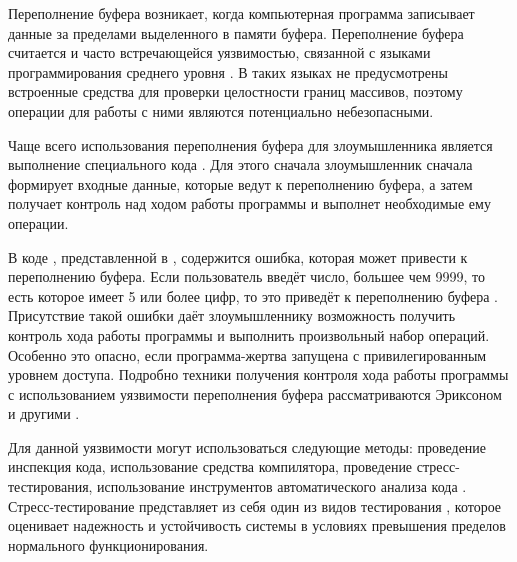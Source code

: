 

%
Переполнение буфера возникает, когда компьютерная программа записывает данные за пределами выделенного в памяти буфера.
%
Переполнение буфера считается  и часто встречающейся уязвимостью, связанной с языками программирования среднего уровня . 
%
В таких языках не предусмотрены встроенные средства для проверки целостности границ массивов, поэтому операции для работы с ними являются потенциально небезопасными. 

%
Чаще всего  использования переполнения буфера для злоумышленника является выполнение специального кода . 
%
Для этого сначала злоумышленник сначала формирует входные данные, которые ведут к переполнению буфера, а затем получает контроль над ходом работы программы и выполнет необходимые ему операции. 

%
В коде , представленной в , содержится ошибка, которая может привести к переполнению буфера.
%
Если пользователь введёт число, большее чем 9999, то есть которое имеет 5 или более цифр, то это приведёт к переполнению буфера .
%
Присутствие такой ошибки даёт злоумышленнику возможность получить контроль хода работы программы и выполнить произвольный набор операций.
%
Особенно это опасно, если программа-жертва запущена с привилегированным уровнем доступа.
%
Подробно техники получения контроля хода работы программы с использованием уязвимости переполнения буфера рассматриваются Эриксоном и другими  .

%
Для  данной уязвимости могут использоваться следующие методы: проведение инспекция кода, использование средства компилятора, проведение стресс-тестирования, использование инструментов автоматического анализа кода   .
%
Стресс-тестирование представляет из себя один из видов тестирования , которое оценивает надежность и устойчивость системы в условиях превышения пределов нормального функционирования. 

